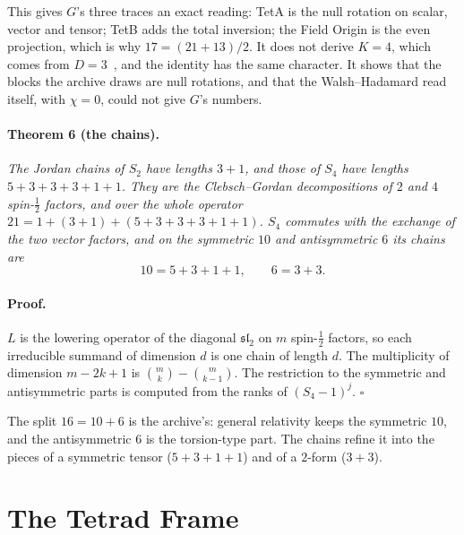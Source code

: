 \documentclass[twocolumn]{iopjournal}
\begin{document}
\medskip
\noindent
This gives $G$'s three traces an exact reading: TetA is the null
rotation on scalar, vector and tensor; TetB adds the total inversion;
the Field Origin is the even projection, which is why
$17 = (21 + 13)/2$. It does not derive $K = 4$, which comes from
$D = 3$~\cite{Nelson2026hadamard}, and the identity has the same
character. It shows that the blocks the archive draws are null
rotations, and that the Walsh--Hadamard read itself, with $\chi = 0$,
could not give $G$'s numbers.

\paragraph{Theorem 6 (the chains).} \textit{The Jordan chains of $S_2$
have lengths $3 + 1$, and those of $S_4$ have lengths $5 + 3 + 3 + 3 +
1 + 1$. They are the Clebsch--Gordan decompositions of $2$ and $4$
spin-$\tfrac12$ factors, and over the whole operator
$21 = 1 + (3 + 1) + (5 + 3 + 3 + 3 + 1 + 1)$. $S_4$ commutes with the
exchange of the two vector factors, and on the symmetric $10$ and
antisymmetric $6$ its chains are}
\begin{equation}
  10 = 5 + 3 + 1 + 1, \qquad 6 = 3 + 3 .
\end{equation}

\paragraph{Proof.} $L$ is the lowering operator of the diagonal
$\mathfrak{sl}_2$ on $m$ spin-$\tfrac12$ factors, so each irreducible
summand of dimension $d$ is one chain of length $d$. The multiplicity
of dimension $m - 2k + 1$ is $\binom{m}{k} - \binom{m}{k-1}$. The
restriction to the symmetric and antisymmetric parts is computed from
the ranks of $(S_4 - 1)^j$. \hfill $\square$

\medskip
\noindent
The split $16 = 10 + 6$ is the archive's: general relativity keeps the
symmetric $10$, and the antisymmetric $6$ is the torsion-type part.
The chains refine it into the pieces of a symmetric tensor
($5 + 3 + 1 + 1$) and of a $2$-form ($3 + 3$).


\section*{The Tetrad Frame}
\end{document}
